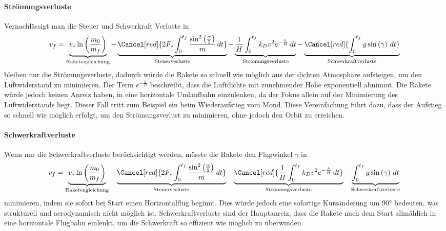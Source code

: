 \paragraph{Strömungsverluste} Vernachlässigt man die Steuer und Schwerkraft Verluste in  
\begin{equation*}
	v_f = \underbrace{v_* \ln \left(\frac{m_0}{m_f}\right)}_{\text{Raketengleichung}} 
	- \underbrace{\Cancel[red]{2F_* \int_0^{t_f} \frac{\sin^2\left(\frac{\alpha}{2}\right)}{m} \, dt }}_{\text{Steuerverluste}}
	- \underbrace{\frac{1}{H} \int_0^{t_f} k_Dv^2 e^{-\frac{h}{H}} \, dt }_{\text{Strömungsverluste}}
	- \underbrace{\Cancel[red]{\int_0^{t_f} g \sin \left(\gamma\right) \, dt}}_{\text{Schwerkraftverluste}}
\end{equation*}
bleiben nur die Strömungsverluste, dadurch würde die Rakete so schnell wie möglich aus der dichten Atmosphäre aufsteigen, um den Luftwiderstand zu minimieren. 
Der Term $e^{-\frac{h}{H}}$ beschreibt, dass die Luftdichte mit zunehmender Höhe exponentiell abnimmt. 
Die Rakete würde jedoch keinen Anreiz haben, in eine horizontale Umlaufbahn einzulenken, da der Fokus allein auf der Minimierung des Luftwiderstands liegt.
Dieser Fall tritt zum Beispiel ein beim Wiederaufstieg vom Mond.
Diese Vereinfachung führt dazu, dass der Aufstieg so schnell wie möglich erfolgt, um den Strömungsverlust zu minimieren, ohne jedoch den Orbit zu erreichen.

\paragraph{Schwerkraftverluste} Wenn nur die Schwerkraftverluste berücksichtigt werden, müsste die Rakete den Flugwinkel \(\gamma\) in
\begin{equation*}
	v_f = \underbrace{v_* \ln \left(\frac{m_0}{m_f}\right)}_{\text{Raketengleichung}} 
	- \underbrace{\Cancel[red]{2F_* \int_0^{t_f} \frac{\sin^2\left(\frac{\alpha}{2}\right)}{m} \, dt }}_{\text{Steuerverluste}}
	- \underbrace{\Cancel[red]{\frac{1}{H} \int_0^{t_f} k_Dv^2 e^{-\frac{h}{H}} \, dt }}_{\text{Strömungsverluste}}
	- \underbrace{\int_0^{t_f} g \sin \left(\gamma\right) \, dt}_{\text{Schwerkraftverluste}}
\end{equation*}
minimieren, indem sie sofort bei Start einen Horizontalflug beginnt. 
Dies würde jedoch eine sofortige Kursänderung um 90° bedeuten, was strukturell und aerodynamisch nicht möglich ist. 
Schwerkraftverluste sind der Hauptanreiz, dass die Rakete nach dem Start allmählich in eine horizontale Flugbahn einlenkt, um die Schwerkraft so effizient wie möglich zu überwinden.

